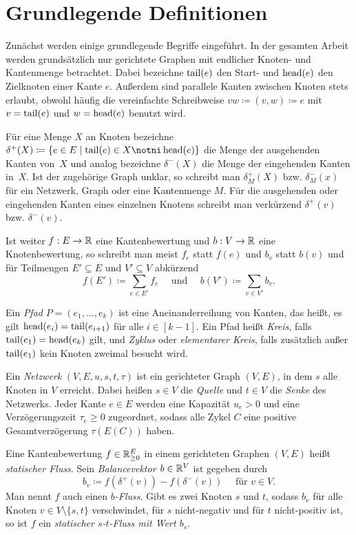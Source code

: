 
\section{Grundlegende Definitionen}

Zunächst werden einige grundlegende Begriffe eingeführt.
In der gesamten Arbeit werden grundsätzlich nur gerichtete Graphen mit endlicher Knoten- und Kantenmenge betrachtet.
Dabei bezeichne $\operatorname{tail}(e)$ den Start- und $\operatorname{head}(e)$ den Zielknoten einer Kante $e$.
Außerdem sind parallele Kanten zwischen Knoten stets erlaubt, obwohl häufig die vereinfachte Schreibweise $vw\coloneq (v,w)\coloneq e$ mit $v=\operatorname{tail}(e)$ und $w=\operatorname{head}(e)$ benutzt wird.

Für eine Menge $X$ an Knoten bezeichne $\delta^+(X)\coloneq \{ e\in E \mid \tail(e) \in X \notni \head(e) \}$ die Menge der ausgehenden Kanten von~$X$ und analog bezeichne $\delta^-(X)$ die Menge der eingehenden Kanten in~$X$.
Ist der zugehörige Graph unklar, so schreibt man $\delta^+_M(X)$ bzw. $\delta^-_M(x)$ für ein Netzwerk, Graph oder eine Kantenmenge $M$.
Für die ausgehenden oder eingehenden Kanten eines einzelnen Knotens schreibt man verkürzend $\delta^+(v)$ bzw. $\delta^-(v)$.

Ist weiter $f: E \rightarrow \mathbb{R}$ eine Kantenbewertung und $b: V \rightarrow \mathbb{R}$ eine Knotenbewertung, so schreibt man meist $f_e$ statt $f(e)$ und $b_v$ statt $b(v)$ und für Teilmengen $E'\subseteq E$ und $V'\subseteq V$ abkürzend
\[ 
	f(E')\coloneq \sum_{e \in E'} f_e \text{~~~ und ~~~} b(V')\coloneq\sum_{v\in V'} b_v.
\]

Ein \emph{Pfad} $P=(e_1, \dots, e_k)$ ist eine Aneinanderreihung von Kanten, das heißt, es gilt $\operatorname{head}(e_i) = \operatorname{tail}(e_{i+1})$ für alle $i\in[k-1]$.
Ein Pfad heißt \emph{Kreis}, falls $\operatorname{tail}(e_1) = \operatorname{head}(e_k)$ gilt, und \emph{Zyklus} oder \emph{elementarer Kreis}, falls zusätzlich außer $\operatorname{tail}(e_1)$ kein Knoten zweimal besucht wird.

\begin{definition}
	Ein \emph{Netzwerk} $(V, E, u, s, t, \tau)$ ist ein gerichteter Graph $(V,E)$, in dem $s$ alle Knoten in $V$ erreicht.
	Dabei heißen $s\in V$ die \emph{Quelle} und $t\in V$ die \emph{Senke} des Netzwerks.
	Jeder Kante $e\in E$ werden eine Kapazität $u_e > 0$ und eine Verzögerungszeit $\tau_e\geq 0$ zugeordnet, sodass alle Zykel $C$ eine positive Gesamtverzögerung $\tau(E(C))$ haben.
\end{definition}
\begin{definition}
	Eine Kantenbewertung $f\in\mathbb{R}_{\geq 0}^E$ in einem gerichteten Graphen $(V, E)$ heißt \emph{statischer Fluss}.
	Sein \emph{Balancevektor $b\in \mathbb{R}^V$} ist gegeben durch
	\[ b_v \coloneq f(\delta^+(v)) - f(\delta^-(v)) \text{~~~ für $v\in V$}. \]
	Man nennt $f$ auch einen \emph{$b$-Fluss}.
	Gibt es zwei Knoten $s$ und $t$, sodass $b_v$
	für alle Knoten $v\in V\setminus\{ s, t \}$ verschwindet, für $s$ nicht-negativ und für $t$ nicht-positiv ist, so ist $f$ ein \emph{statischer $s$-$t$-Fluss mit Wert $b_s$}.
\end{definition}

